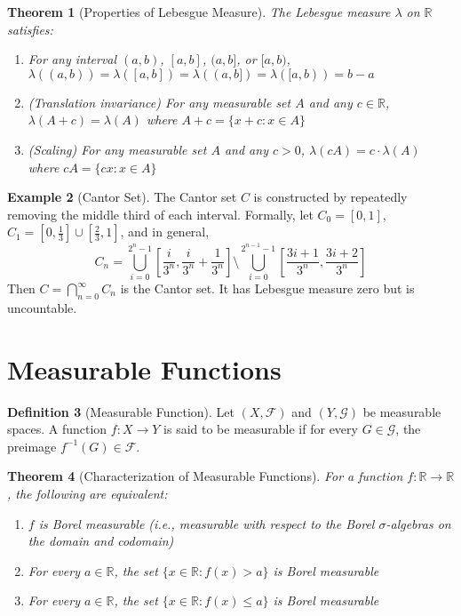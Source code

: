 \documentclass[12pt,a4paper]{article}
\theoremstyle{plain}
\newtheorem{theorem}{Theorem}[section]
\theoremstyle{definition}
\newtheorem{definition}[theorem]{Definition}
\newtheorem{example}[theorem]{Example}
\begin{document}
\begin{theorem}[Properties of Lebesgue Measure]
The Lebesgue measure $\lambda$ on $\mathbb{R}$ satisfies:
\begin{enumerate}[label=(\roman*)]
\item For any interval $(a,b)$, $[a,b]$, $(a,b]$, or $[a,b)$, $\lambda((a,b)) = \lambda([a,b]) = \lambda((a,b]) = \lambda([a,b)) = b - a$
\item (Translation invariance) For any measurable set $A$ and any $c \in \mathbb{R}$, $\lambda(A + c) = \lambda(A)$ where $A + c = \{x + c : x \in A\}$
\item (Scaling) For any measurable set $A$ and any $c > 0$, $\lambda(cA) = c \cdot \lambda(A)$ where $cA = \{cx : x \in A\}$
\end{enumerate}
\end{theorem}

\begin{example}[Cantor Set]
The Cantor set $C$ is constructed by repeatedly removing the middle third of each interval. Formally, let $C_0 = [0,1]$, $C_1 = [0,\frac{1}{3}] \cup [\frac{2}{3},1]$, and in general,
\begin{equation}
C_n = \bigcup_{i=0}^{2^n-1} \left[\frac{i}{3^n}, \frac{i}{3^n} + \frac{1}{3^n}\right] \setminus \bigcup_{i=0}^{2^{n-1}-1} \left[\frac{3i+1}{3^n}, \frac{3i+2}{3^n}\right]
\end{equation}
Then $C = \bigcap_{n=0}^{\infty} C_n$ is the Cantor set. It has Lebesgue measure zero but is uncountable.
\end{example}

\section{Measurable Functions}

\begin{definition}[Measurable Function]
Let $(X, \mathcal{F})$ and $(Y, \mathcal{G})$ be measurable spaces. A function $f: X \to Y$ is said to be measurable if for every $G \in \mathcal{G}$, the preimage $f^{-1}(G) \in \mathcal{F}$.
\end{definition}

\begin{theorem}[Characterization of Measurable Functions]
For a function $f: \mathbb{R} \to \mathbb{R}$, the following are equivalent:
\begin{enumerate}[label=(\roman*)]
\item $f$ is Borel measurable (i.e., measurable with respect to the Borel $\sigma$-algebras on the domain and codomain)
\item For every $a \in \mathbb{R}$, the set $\{x \in \mathbb{R} : f(x) > a\}$ is Borel measurable
\item For every $a \in \mathbb{R}$, the set $\{x \in \mathbb{R} : f(x) \leq a\}$ is Borel measurable
\end{enumerate}
\end{theorem}
\end{document}
